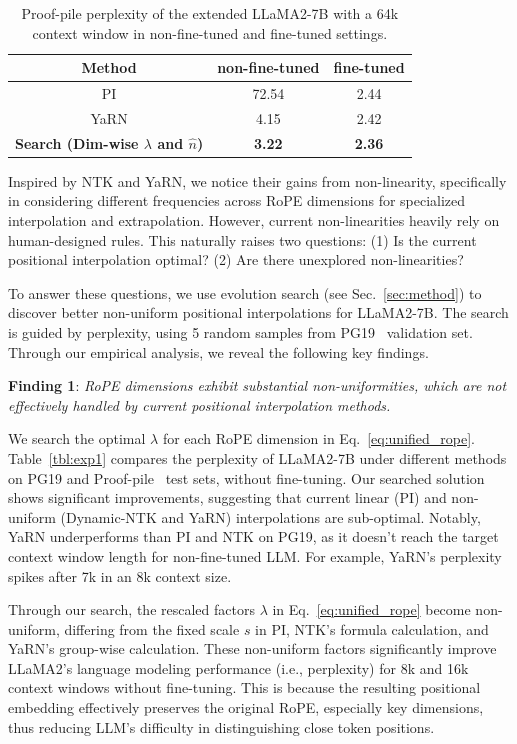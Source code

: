 \begin{table}[t]
	\caption{Proof-pile perplexity of the extended LLaMA2-7B with a 64k context window in non-fine-tuned and fine-tuned settings.}
	\label{tbl:finetune}
	\small
	\centering 
		\begin{tabular}
			{c|cc}
			\toprule
			Method	&non-fine-tuned&fine-tuned\\
			\hline
			PI& 72.54& 2.44\\
			\hline
			YaRN & 4.15&2.42 \\
			\hline
			\textbf{Search (Dim-wise $\lambda$ and $\hat n$)} &\bf 3.22 &\bf 2.36 \\
			\hline		\end{tabular}
\end{table}

Inspired by NTK and YaRN, we notice their gains from non-linearity, specifically in considering different frequencies across RoPE dimensions for specialized interpolation and extrapolation. However, current non-linearities heavily rely on human-designed rules. This naturally raises two questions: (1) Is the current positional interpolation optimal? (2) Are there unexplored  non-linearities? 

To answer these questions, we use evolution search (see Sec.~\ref{sec:method}) to discover better non-uniform positional interpolations for LLaMA2-7B. The search is guided by perplexity, using 5 random samples from PG19~\cite{pg19} validation set.  Through our empirical analysis, we reveal the following key findings. 

\textbf{Finding 1}: \textit{RoPE dimensions exhibit substantial non-uniformities, which are not effectively handled by current positional interpolation methods.}

We  search the optimal $\lambda$ for each RoPE dimension in Eq.~\ref{eq:unified_rope}. Table~\ref{tbl:exp1} compares the perplexity of LLaMA2-7B under different  methods on PG19 and Proof-pile~\cite{proof-pile} test sets, without fine-tuning. Our searched solution shows significant improvements, suggesting that current linear (PI) and non-uniform (Dynamic-NTK and YaRN) interpolations are sub-optimal. Notably, YaRN underperforms  than PI and NTK on PG19, as it doesn't reach the target context window length for non-fine-tuned LLM. For example, YaRN's perplexity spikes after 7k in an 8k context size. 

Through our search,  the rescaled factors $\lambda$ in Eq.~\ref{eq:unified_rope} become non-uniform, differing from the fixed scale $s$ in PI, NTK's formula calculation, and YaRN's group-wise calculation. These non-uniform factors significantly improve LLaMA2's language modeling performance (i.e., perplexity) for 8k and 16k context windows without fine-tuning. This is because the resulting positional embedding effectively preserves the original RoPE, especially key dimensions, thus reducing LLM's difficulty in distinguishing close token positions.

